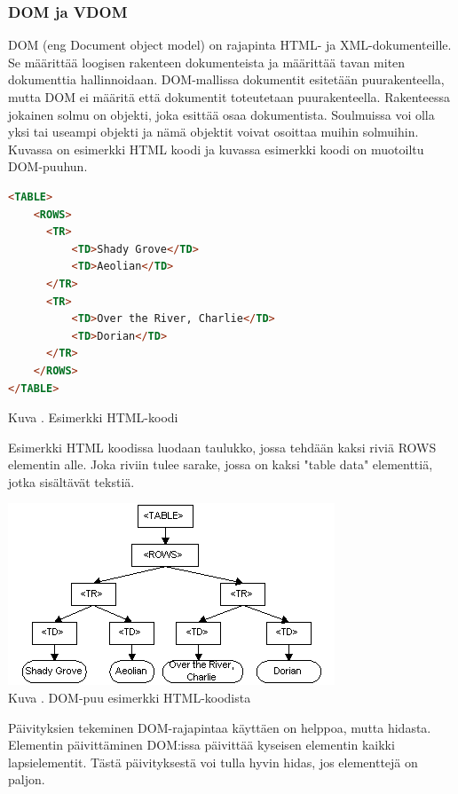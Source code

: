 \subsubsection{DOM ja VDOM}




DOM (eng Document object model) on rajapinta HTML- ja XML-dokumenteille. 
Se määrittää loogisen rakenteen dokumenteista ja määrittää tavan miten dokumenttia hallinnoidaan.
DOM-mallissa dokumentit esitetään puurakenteella, mutta DOM ei määritä että dokumentit toteutetaan puurakenteella.
Rakenteessa jokainen solmu on objekti, joka esittää osaa dokumentista. 
Soulmuissa voi olla yksi tai useampi objekti ja nämä objektit voivat osoittaa muihin solmuihin.
Kuvassa \nextImageCount{} on esimerkki HTML koodi ja kuvassa \nextnextImageCount {} esimerkki koodi on muotoiltu DOM-puuhun.
\bigskip



    
\begin{tcolorbox}
\begin{lstlisting}[language=html]
<TABLE>
    <ROWS> 
      <TR> 
          <TD>Shady Grove</TD>
          <TD>Aeolian</TD> 
      </TR> 
      <TR>
          <TD>Over the River, Charlie</TD>
          <TD>Dorian</TD> 
      </TR> 
    </ROWS>
</TABLE>
\end{lstlisting}
\end{tcolorbox}
Kuva \getImgCount. Esimerkki HTML-koodi
\medskip


Esimerkki HTML koodissa luodaan taulukko, jossa tehdään kaksi riviä ROWS elementin alle. 
Joka riviin tulee sarake, jossa on kaksi "table data"{} elementtiä, jotka sisältävät tekstiä.


\bigskip
\includegraphics{./src/public/oppar/dom.png}\\
Kuva \getImgCount {}. DOM-puu esimerkki HTML-koodista 
\medskip



Päivityksien tekeminen DOM-rajapintaa käyttäen on helppoa, mutta hidasta.
Elementin päivittäminen DOM:issa päivittää kyseisen elementin kaikki lapsielementit. 
Tästä päivityksestä voi tulla hyvin hidas, jos elementtejä on paljon.
\bigskip




